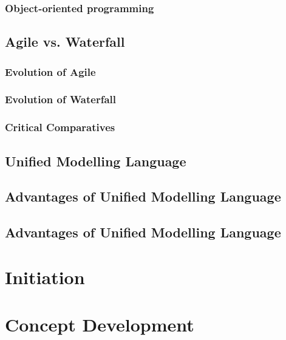\documentclass[a4paper,12pt]{article}
\begin{document}
\subsubsection {Object-oriented programming}

\subsection {Agile vs. Waterfall}
\subsubsection {Evolution of Agile}
\subsubsection {Evolution of Waterfall}
\subsubsection {Critical Comparatives}
\subsection {Unified Modelling Language}
\subsection {Advantages of Unified Modelling Language}
\subsection {Advantages of Unified Modelling Language}



\section {Initiation}


\section {Concept Development}
\end{document}
